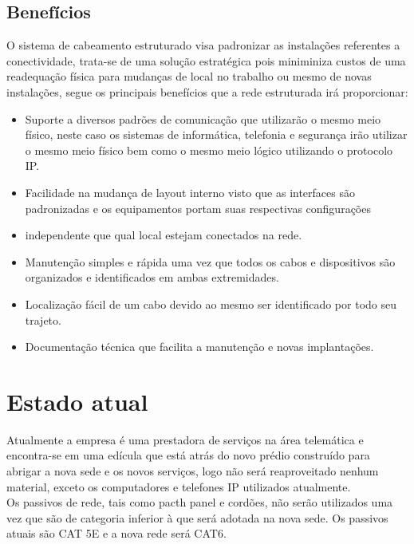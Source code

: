 \documentclass[	DIV=calc,%
							paper=a4,%
							fontsize=12pt,%
							onecolumn]{scrartcl}	 					%
\begin{document}
\subsection{Benefícios}
O sistema de cabeamento estruturado visa padronizar as instalações referentes a conectividade, trata-se de uma solução estratégica pois miniminiza custos de uma readequação física para mudanças de local no trabalho ou mesmo de novas instalações, segue os principais benefícios que a rede estruturada irá proporcionar:
\begin{itemize}
\item Suporte a diversos padrões de comunicação que utilizarão o mesmo meio físico, neste caso os sistemas de informática, telefonia e segurança irão utilizar o mesmo meio físico bem como o mesmo meio lógico utilizando o protocolo IP.
\item Facilidade na mudança de layout interno visto que as interfaces são padronizadas e os equipamentos portam suas respectivas configurações \item independente que qual local estejam conectados na rede.
\item Manutenção simples e rápida uma vez que todos os cabos e dispositivos são organizados e identificados em ambas extremidades.
\item Localização fácil de um cabo devido ao mesmo ser identificado por todo seu trajeto.
\item Documentação técnica que facilita a manutenção e novas implantações.
\end{itemize}
 
\section{Estado atual}

Atualmente a empresa é uma prestadora de serviços na área telemática e encontra-se em uma edícula que está atrás do novo prédio construído para abrigar a nova sede e os novos serviços, logo não será reaproveitado nenhum material, exceto os computadores e telefones IP utilizados atualmente.\\
Os passivos de rede, tais como pacth panel e cordões, não serão utilizados uma vez que são de categoria inferior à que será adotada na nova sede. Os passivos atuais são CAT 5E e a nova rede será CAT6.


\end{document}
